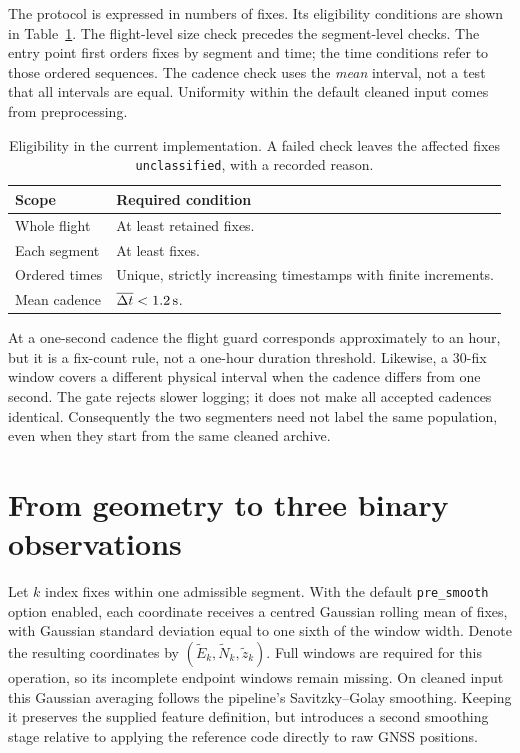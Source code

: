 The protocol is expressed in numbers of fixes. Its eligibility conditions are shown
in Table~\ref{tab:vilpellet-gates}. The flight-level size check precedes the
segment-level checks. The entry point first orders fixes by segment and time; the
time conditions refer to those ordered sequences. The cadence check uses the
\emph{mean} interval, not a test that all intervals are equal. Uniformity within the
default cleaned input comes from preprocessing.

\begin{table}[htbp]
\centering\small
\caption{Eligibility in the current implementation. A failed check leaves the
 affected fixes \texttt{unclassified}, with a recorded reason.}
\label{tab:vilpellet-gates}
\begin{tabularx}{\textwidth}{@{}lX@{}}
\toprule
Scope & Required condition \\
\midrule
Whole flight & At least \VilpMinFixes{} retained fixes. \\
Each segment & At least \VilpPersistenceFixes{} fixes. \\
Ordered times & Unique, strictly increasing timestamps with finite increments. \\
Mean cadence & $\overline{\Delta t}<1.2\,\mathrm{s}$. \\
\bottomrule
\end{tabularx}
\end{table}

At a one-second cadence the flight guard corresponds approximately to an hour, but
it is a fix-count rule, not a one-hour duration threshold. Likewise, a 30-fix window
covers a different physical interval when the cadence differs from one second.
The gate rejects slower logging; it does not make all accepted cadences identical.
Consequently the two segmenters need not label the same population, even when they
start from the same cleaned archive.

\section{From geometry to three binary observations}
\label{sec:vilpellet-features}
Let $k$ index fixes within one admissible segment. With the default
\texttt{pre\_smooth} option enabled, each coordinate receives a centred Gaussian
rolling mean of \VilpPositionSmoothingFixes{} fixes, with Gaussian standard deviation
equal to one sixth of the window width. Denote the resulting coordinates by
$(\widetilde E_k,\widetilde N_k,\widetilde z_k)$. Full windows are required for this
operation, so its incomplete endpoint windows remain missing. On cleaned input this
Gaussian averaging follows the pipeline's Savitzky--Golay smoothing. Keeping it
preserves the supplied feature definition, but introduces a second smoothing stage
relative to applying the reference code directly to raw GNSS positions.

